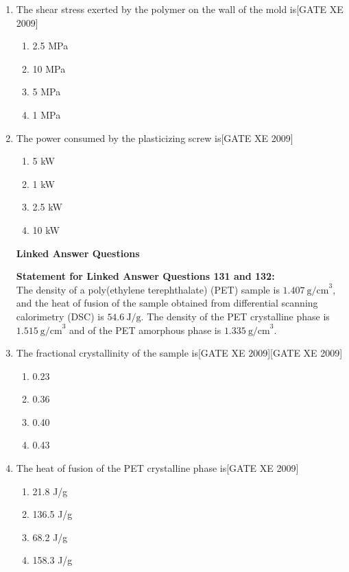 \documentclass[journal,12pt,onecolumn]{IEEEtran}
\theoremstyle{remark}
\begin{document}
\begin{enumerate}
\item The shear stress exerted by the polymer on the wall of the mold is\hfill[GATE XE 2009]
\begin{multicols}{2}
\begin{enumerate}
\item 2.5 MPa
\item 10 MPa
\item 5 MPa
\item 1 MPa
\end{enumerate}
\end{multicols}

\item The power consumed by the plasticizing screw is\hfill[GATE XE 2009]
\begin{multicols}{2}
\begin{enumerate}
\item 5 kW
\item 1 kW
\item 2.5 kW
\item 10 kW
\end{enumerate}
\end{multicols}




\textbf{Linked Answer Questions}

\textbf{Statement for Linked Answer Questions 131 and 132:}\\
The density of a poly(ethylene terephthalate) (PET) sample is $1.407~\text{g/cm}^3$, and the heat of fusion of the sample obtained from differential scanning calorimetry (DSC) is $54.6~\text{J/g}$. The density of the PET crystalline phase is $1.515~\text{g/cm}^3$ and of the PET amorphous phase is $1.335~\text{g/cm}^3$.


\item The fractional crystallinity of the sample is\hfill[GATE XE 2009]\hfill[GATE XE 2009]
\begin{multicols}{2}
\begin{enumerate}
\item 0.23
\item 0.36
\item 0.40
\item 0.43
\end{enumerate}
\end{multicols}

\item The heat of fusion of the PET crystalline phase is\hfill[GATE XE 2009]
\begin{multicols}{2}
\begin{enumerate}
\item 21.8 J/g
\item 136.5 J/g
\item 68.2 J/g
\item 158.3 J/g
\end{enumerate}
\end{multicols}





\end{enumerate}
\end{document}
